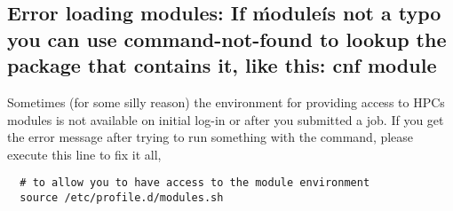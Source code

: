 \subsection{Error loading modules: If \'module\' is not a typo you can use command-not-found to lookup the package that contains it, like this: cnf module}
%
%
Sometimes (for some silly reason) the environment for providing access to HPCs modules is not available on initial log-in or after you submitted a job. If you get the error message  after trying to run something with the  command, please execute this line to fix it all,
%
%
\begin{verbatim}
  # to allow you to have access to the module environment
  source /etc/profile.d/modules.sh
\end{verbatim}
%
%
%
